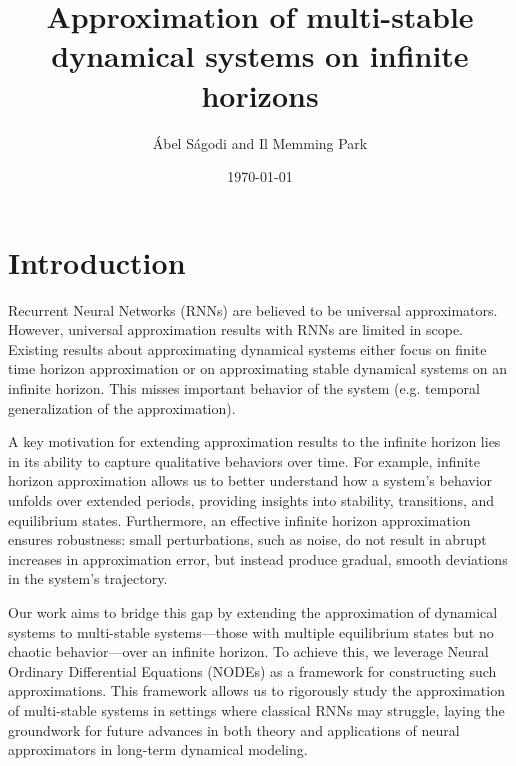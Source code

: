 \documentclass{article}
\title{Approximation of multi-stable dynamical systems on infinite horizons}
\author{\'Abel S\'agodi and Il Memming Park}
\date{\today}
\theoremstyle{definition}
\theoremstyle{remark}
\begin{document}
\maketitle

\section{Introduction}
Recurrent Neural Networks (RNNs) are believed to be universal approximators.
However, universal approximation results with RNNs are limited in scope.
Existing results about approximating dynamical systems either focus on finite time horizon approximation or on approximating stable dynamical systems on an infinite horizon.
This misses important behavior of the system (e.g. temporal generalization of the approximation).


A key motivation for extending approximation results to the infinite horizon lies in its ability to capture qualitative behaviors over time. For example, infinite horizon approximation allows us to better understand how a system's behavior unfolds over extended periods, providing insights into stability, transitions, and equilibrium states.
 Furthermore, an effective infinite horizon approximation ensures robustness: small perturbations, such as noise, do not result in abrupt increases in approximation error, but instead produce gradual, smooth deviations in the system's trajectory.

Our work aims to bridge this gap by extending the approximation of dynamical systems to multi-stable systems—those with multiple equilibrium states but no chaotic behavior—over an infinite horizon. 
To achieve this, we leverage Neural Ordinary Differential Equations (NODEs) as a framework for constructing such approximations.
This framework allows us to rigorously study the approximation of multi-stable systems in settings where classical RNNs may struggle, laying the groundwork for future advances in both theory and applications of neural approximators in long-term dynamical modeling.

\end{document}
